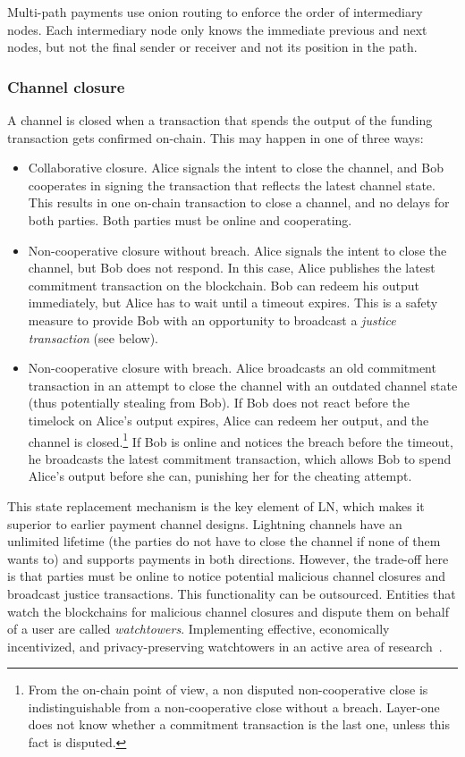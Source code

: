 Multi-path payments use onion routing to enforce the order of intermediary nodes.
Each intermediary node only knows the immediate previous and next nodes, but not the final sender or receiver and not its position in the path.


\subsubsection*{Channel closure}

A channel is closed when a transaction that spends the output of the funding transaction gets confirmed on-chain.
This may happen in one of three ways:

\begin{itemize}
	\item Collaborative closure. Alice signals the intent to close the channel, and Bob cooperates in signing the transaction that reflects the latest channel state. This results in one on-chain transaction to close a channel, and no delays for both parties. Both parties must be online and cooperating.
	\item Non-cooperative closure without breach. Alice signals the intent to close the channel, but Bob does not respond. In this case, Alice publishes the latest commitment transaction on the blockchain. Bob can redeem his output immediately, but Alice has to wait until a timeout expires. This is a safety measure to provide Bob with an opportunity to broadcast a \textit{justice transaction} (see below).
	\item Non-cooperative closure with breach. Alice broadcasts an old commitment transaction in an attempt to close the channel with an outdated channel state (thus potentially stealing from Bob). If Bob does not react before the timelock on Alice's output expires, Alice can redeem her output, and the channel is closed.\footnote{From the on-chain point of view, a non disputed non-cooperative close is indistinguishable from a non-cooperative close without a breach. Layer-one does not know whether a commitment transaction is the last one, unless this fact is disputed.} If Bob is online and notices the breach before the timeout, he broadcasts the latest commitment transaction, which allows Bob to spend Alice's output before she can, punishing her for the cheating attempt.
\end{itemize}

This state replacement mechanism is the key element of LN, which makes it superior to earlier payment channel designs.
Lightning channels have an unlimited lifetime (the parties do not have to close the channel if none of them wants to) and supports payments in both directions.
However, the trade-off here is that parties must be online to notice potential malicious channel closures and broadcast justice transactions.
This functionality can be outsourced.
Entities that watch the blockchains for malicious channel closures and dispute them on behalf of a user are called \textit{watchtowers}.
Implementing effective, economically incentivized, and privacy-preserving watchtowers in an active area of research~\cite{McCorry2019}.

